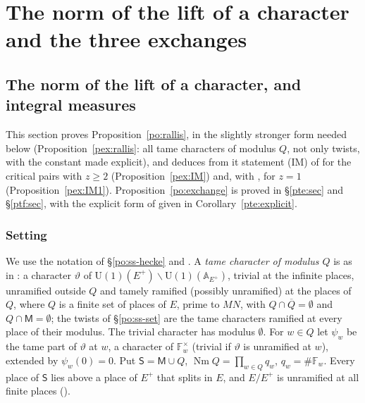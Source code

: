 \documentclass[10pt]{amsart}
\theoremstyle{definition}
\theoremstyle{remark}
\providecommand{\pcW}{\mathbb W}
\providecommand{\psHS}{\mathcal H}
\providecommand{\psvac}{\mathbf v}
\begin{document}
\section{The norm of the lift of a character and the three exchanges}\label{C2:g2}
\providecommand{\auO}{\mathcal O}
\providecommand{\auU}{\mathrm U}
\providecommand{\auGL}{\mathrm{GL}}
\providecommand{\auHom}{\operatorname{Hom}}
\providecommand{\auNm}{\operatorname{Nm}}
\providecommand{\auA}{\mathbb A}
\providecommand{\auF}{\mathbb F}
\providecommand{\auPl}{\Phi}
\providecommand{\aubar}[1]{\overline{#1}}
\providecommand{\plone}{\mathbf 1}
\providecommand{\auf}[1]{\texttt{#1}}
\providecommand{\pop}{\mathsf p}
\providecommand{\pcR}{R}
\providecommand{\pcW}{\mathsf W}
\providecommand{\psHS}{\mathcal S}
\providecommand{\pao}{\mathfrak o}
\providecommand{\psvac}{{\phi^{\mathrm{vac}}}}
\providecommand{\pexK}{K^{(z)}}
\providecommand{\pexmc}{\mathfrak c}
\providecommand{\pexMat}{\mathrm M}

\subsection{The norm of the lift of a character, and integral measures}\label{pex:sec}

This section proves Proposition~\ref{po:rallis}, in the slightly stronger form needed below
(Proposition~\ref{pex:rallis}: all tame characters of modulus $Q$, not only twists, with the
constant made explicit), and deduces from it statement (IM) of {\cite[\S3.5]{P55}} for the
critical pairs with $z\ge2$ (Proposition~\ref{pex:IM}) and, with {\cite[Theorem~3.2]{P53}}, for $z=1$
(Proposition~\ref{pex:IM1}). Proposition~\ref{po:exchange} is proved in \S\ref{pte:sec} and \S\ref{ptf:sec}, with the explicit form of
{\cite[Theorem~3.2]{P53}} given in Corollary~\ref{pte:explicit}.

\subsubsection{Setting}\label{pex:ss-set}

We use the notation of \S\ref{po:ss-hecke} and {\cite[\S3.5]{P55}}. A \emph{tame character of
modulus $Q$} is as in {\cite[\S3.5]{P55}}: a character $\vartheta$ of $\auU(1)(E^+)\backslash
\auU(1)(\auA_{E^+})$, trivial at the infinite places, unramified outside $Q$ and tamely ramified
(possibly unramified) at the places of $Q$, where $Q$ is a finite set of places of $E$, prime to
$MN$, with $Q\cap\aubar Q=\emptyset$ and $Q\cap\mathsf M=\emptyset$; the twists of
\S\ref{po:ss-set} are the tame characters ramified at every place of their modulus. The trivial
character has modulus $\emptyset$. For $w\in Q$ let $\psi_w$ be the tame part of $\vartheta$ at
$w$, a character of $\auF_w^\times$ (trivial if $\vartheta$ is unramified at $w$), extended by
$\psi_w(0)=0$. Put $\mathsf S=\mathsf M\cup Q$, $\auNm Q=\prod_{w\in Q}q_w$, $q_w=\#\auF_w$.
Every place of $\mathsf S$ lies above a place of $E^+$ that splits in $E$, and $E/E^+$ is
unramified at all finite places ({\cite[\S2.3]{P53}}).
\end{document}
